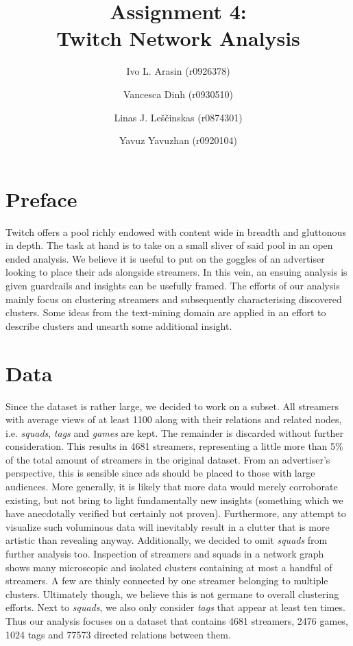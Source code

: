 \documentclass[11pt, oneside]{article}   	%
\title{Assignment 4: \\ Twitch Network Analysis}
\author{\centering Ivo L. Arasin (r0926378) \and Vancesca Dinh (r0930510) \and Linas J. Leščinskas (r0874301) \and Yavuz Yavuzhan (r0920104)}
\begin{document}
\maketitle
\section{Preface}
Twitch offers a pool richly endowed with content wide in breadth and gluttonous in depth. The task at hand is to take on a small sliver of said pool in an open ended analysis. We believe it is useful to put on the goggles of an advertiser looking to place their ads alongside streamers. In this vein, an ensuing analysis is given guardrails and insights can be usefully framed.\newline
The efforts of our analysis mainly focus on clustering streamers and subsequently characterising discovered clusters. Some ideas from the text-mining domain are applied in an effort to describe clusters and unearth some additional insight.
\section{Data}
Since the dataset is rather large, we decided to work on a subset. All streamers with average views of at least 1100 along with their relations and related nodes, i.e. \textit{squads}, \textit{tags} and \textit{games} are kept. The remainder is discarded without further consideration. This results in 4681 streamers, representing a little more than 5\% of the total amount of streamers in the original dataset. From an advertiser's perspective, this is sensible since ads should be placed to those with large audiences. More generally, it is likely that more data would merely corroborate existing, but not bring to light fundamentally new insights (something which we have anecdotally verified but certainly not proven). Furthermore, any attempt to visualize such voluminous data will inevitably result in a clutter that is more artistic than revealing anyway.
\newline
Additionally, we decided to omit \textit{squads} from further analysis too. Inspection of streamers and squads in a network graph shows many microscopic and isolated clusters containing at most a handful of streamers. A few are thinly connected by one streamer belonging to multiple clusters.
Ultimately though, we believe this is not germane to overall clustering efforts.
Next to \textit{squads}, we also only consider \textit{tags} that appear at least ten times.
\newline
Thus our analysis focuses on a dataset that contains 4681 streamers, 2476 games, 1024 tags and 77573 directed relations between them.
\end{document}

